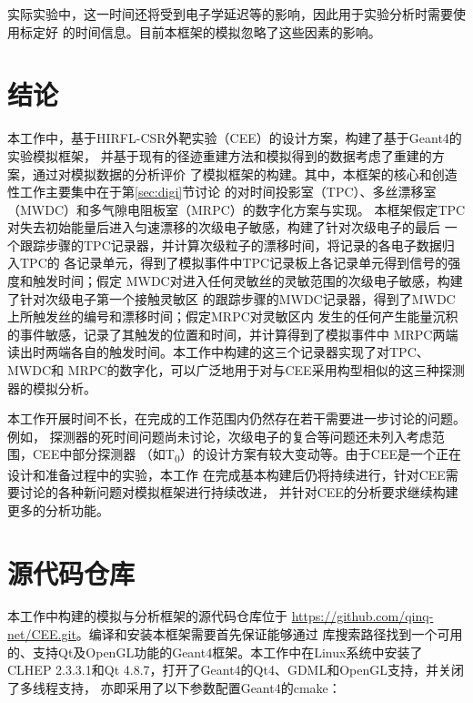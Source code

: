 \documentclass[bachelor,openany,oneside,color]{buaathesis}
\def\TZ{T\textsubscript{0}}
\begin{document}
实际实验中，这一时间还将受到电子学延迟等的影响，因此用于实验分析时需要使用标定好
的时间信息。目前本框架的模拟忽略了这些因素的影响。


\chapter*{结论}
本工作中，基于HIRFL-CSR外靶实验（CEE）的设计方案，构建了基于Geant4的实验模拟框架，
并基于现有的径迹重建方法和模拟得到的数据考虑了重建的方案，通过对模拟数据的分析评价
了模拟框架的构建。其中，本框架的核心和创造性工作主要集中在于第\ref{sec:digi}节讨论
的对时间投影室（TPC）、多丝漂移室（MWDC）和多气隙电阻板室（MRPC）的数字化方案与实现。
本框架假定TPC对失去初始能量后进入匀速漂移的次级电子敏感，构建了针对次级电子的最后
一个跟踪步骤的TPC记录器，并计算次级粒子的漂移时间，将记录的各电子数据归入TPC的
各记录单元，得到了模拟事件中TPC记录板上各记录单元得到信号的强度和触发时间；假定
MWDC对进入任何灵敏丝的灵敏范围的次级电子敏感，构建了针对次级电子第一个接触灵敏区
的跟踪步骤的MWDC记录器，得到了MWDC上所触发丝的编号和漂移时间；假定MRPC对灵敏区内
发生的任何产生能量沉积的事件敏感，记录了其触发的位置和时间，并计算得到了模拟事件中
MRPC两端读出时两端各自的触发时间。本工作中构建的这三个记录器实现了对TPC、MWDC和
MRPC的数字化，可以广泛地用于对与CEE采用构型相似的这三种探测器的模拟分析。

本工作开展时间不长，在完成的工作范围内仍然存在若干需要进一步讨论的问题。例如，
探测器的死时间问题尚未讨论，次级电子的复合等问题还未列入考虑范围，CEE中部分探测器
（如\TZ）的设计方案有较大变动等。由于CEE是一个正在设计和准备过程中的实验，本工作
在完成基本构建后仍将持续进行，针对CEE需要讨论的各种新问题对模拟框架进行持续改进，
并针对CEE的分析要求继续构建更多的分析功能。



%
\printbibliography[heading=bibintoc,title={参考文献}]

\appendix
\chapter{源代码仓库}\label{chap:repo}
本工作中构建的模拟与分析框架的源代码仓库位于
\url{https://github.com/qinq-net/CEE.git}。编译和安装本框架需要首先保证能够通过
库搜索路径找到一个可用的、支持Qt及OpenGL功能的Geant4框架。本工作中在Linux系统中安装了
CLHEP 2.3.3.1和Qt 4.8.7，打开了Geant4的Qt4、GDML和OpenGL支持，并关闭了多线程支持，
亦即采用了以下参数配置Geant4的cmake：
\end{document}
